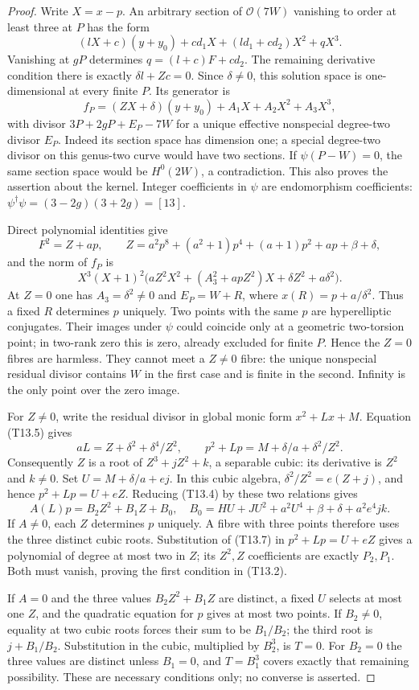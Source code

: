 \begin{proof}
Write $X=x-p$. An arbitrary section of $\mathcal O(7W)$ vanishing
to order at least three at $P$ has the form
\[
 (lX+c)(y+y_0)+cd_1X+(ld_1+cd_2)X^2+qX^3.
\]
Vanishing at $gP$ determines $q=(l+c)F+cd_2$. The remaining
derivative condition there is exactly $\delta l+Zc=0$.
Since $\delta\ne0$, this solution space is one-dimensional at every
finite $P$. Its generator is
\[
 f_P=(ZX+\delta)(y+y_0)+A_1X+A_2X^2+A_3X^3,
\]
with divisor $3P+2gP+E_P-7W$ for a unique effective nonspecial
degree-two divisor $E_P$. Indeed its section space has dimension
one; a special degree-two divisor on this genus-two curve would
have two sections. If $\psi(P-W)=0$, the same section space would
be $H^0(2W)$, a contradiction. This also proves the assertion about
the kernel. Integer coefficients in $\psi$ are endomorphism
coefficients: $\psi^\dagger\psi=(3-2g)(3+2g)=[13]$.

Direct polynomial identities give
\[
 F^2=Z+ap,\qquad
 Z=a^2p^8+(a^2+1)p^4+(a+1)p^2+ap+\beta+\delta,
\tag{T13.4}
\]
and the norm of $f_P$ is
\[
 X^3(X+1)^2
 \bigl(aZ^2X^2+(A_3^2+apZ^2)X+\delta Z^2+a\delta^2\bigr).
\tag{T13.5}
\]
At $Z=0$ one has $A_3=\delta^2\ne0$ and $E_P=W+R$, where
$x(R)=p+a/\delta^2$. Thus a fixed $R$ determines $p$ uniquely.
Two points with the same $p$ are hyperelliptic conjugates. Their
images under $\psi$ could coincide only at a geometric two-torsion
point; in two-rank zero this is zero, already excluded for finite
$P$. Hence the $Z=0$ fibres are harmless. They cannot meet a
$Z\ne0$ fibre: the unique nonspecial residual divisor contains
$W$ in the first case and is finite in the second. Infinity is the
only point over the zero image.

For $Z\ne0$, write the residual divisor in global monic form
$x^2+Lx+M$. Equation (T13.5) gives
\[
 aL=Z+\delta^2+\delta^4/Z^2,\qquad
 p^2+Lp=M+\delta/a+\delta^2/Z^2.
\tag{T13.6}
\]
Consequently $Z$ is a root of $Z^3+jZ^2+k$, a separable cubic:
its derivative is $Z^2$ and $k\ne0$. Set
$U=M+\delta/a+ej$. In this cubic algebra,
$\delta^2/Z^2=e(Z+j)$, and hence $p^2+Lp=U+eZ$.
Reducing (T13.4) by these two relations gives
\[
 A(L)p=B_2Z^2+B_1Z+B_0,
 \quad B_0=HU+JU^2+a^2U^4+\beta+\delta+a^2e^4jk.
\tag{T13.7}
\]
If $A\ne0$, each $Z$ determines $p$ uniquely. A fibre with three
points therefore uses the three distinct cubic roots. Substitution
of (T13.7) in $p^2+Lp=U+eZ$ gives a polynomial of degree at most
two in $Z$; its $Z^2,Z$ coefficients are exactly $P_2,P_1$.
Both must vanish, proving the first condition in (T13.2).

If $A=0$ and the three values $B_2Z^2+B_1Z$ are distinct, a fixed
$U$ selects at most one $Z$, and the quadratic equation for $p$
gives at most two points. If $B_2\ne0$, equality at two cubic roots
forces their sum to be $B_1/B_2$; the third root is $j+B_1/B_2$.
Substitution in the cubic, multiplied by $B_2^3$, is $T=0$.
For $B_2=0$ the three values are distinct unless $B_1=0$, and
$T=B_1^3$ covers exactly that remaining possibility. These are
necessary conditions only; no converse is asserted.
\end{proof}

